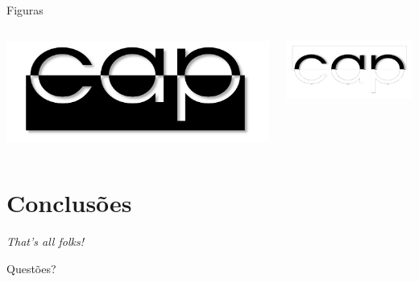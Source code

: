 \documentclass[
	brazilian, %
	14pt, %
]{beamer}
\begin{document}
\begin{frame}{Figuras}
	\begin{columns}
		\begin{column}{0.5\linewidth}
			\includegraphics[width=\linewidth]{cap}
		\end{column}
		\begin{column}{0.5\linewidth}
			\includegraphics[width=\linewidth]{cap_neg}
		\end{column}
	\end{columns}
\end{frame}

\section{Conclusões}
\begin{frame}
	\centering
	\textit{That's all folks!}
	
	\pause
	\alert{Questões?}
\end{frame}
\end{document}

